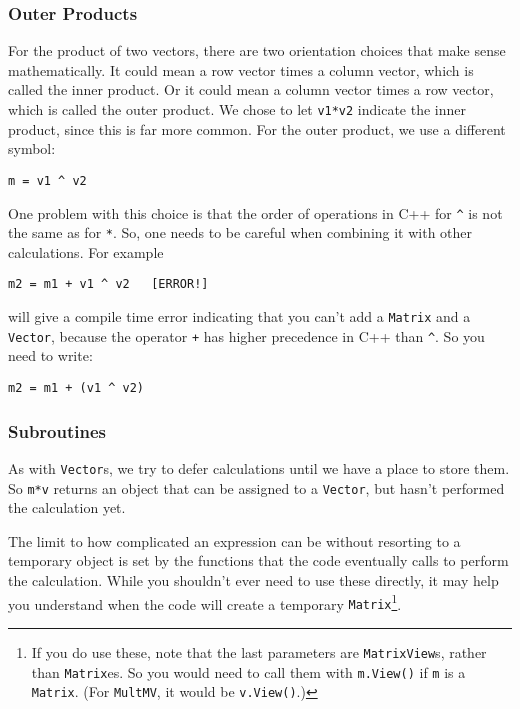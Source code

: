 \documentclass[twoside,letterpaper,11pt]{article}
\renewcommand{\tt}[1]{{\texttt {#1}}}
\begin{document}
\subsubsection{Outer Products}

For the product of two vectors, there are two orientation choices that make sense mathematically.
It could mean a row vector times a column vector, which is called the inner product.
Or it could mean a column vector times a row vector, which is called the outer product.
We chose to let \tt{v1*v2} indicate the inner product, since this is far more common.
For the outer product, we use a different symbol:
\begin{verbatim}
m = v1 ^ v2
\end{verbatim}
One problem with this choice is that the order of operations in C++ for \tt{\^} 
is not the same as for \tt{*}.  
So, one needs to be careful when combining it with other calculations.
For example
\begin{verbatim}
m2 = m1 + v1 ^ v2   [ERROR!]
\end{verbatim}
will give a compile time error indicating that you can't add a 
\tt{Matrix} and a \tt{Vector}, 
because the operator \tt{+} has higher precedence in C++ than \tt{\^}.
So you need to write:
\begin{verbatim}
m2 = m1 + (v1 ^ v2)
\end{verbatim}

\subsubsection{Subroutines}

As with \tt{Vector}s, we try to defer calculations until we have a place to store them.
So \tt{m*v} returns an object that can be assigned to a \tt{Vector},
but hasn't performed the calculation yet.  

The limit to how complicated an expression can be without resorting to a temporary object
is set by the 
functions that the code eventually calls to perform the calculation.  
While you shouldn't ever
need to use these directly, it may help you understand when the code will create a
temporary \tt{Matrix}\footnote{If you do use these, note that the last parameters are
\tt{MatrixView}s, rather than \tt{Matrix}es.  So you would need to 
call them with \tt{m.View()} if \tt{m} is a \tt{Matrix}.  (For \tt{MultMV},
it would be \tt{v.View()}.)}.
\end{document}
